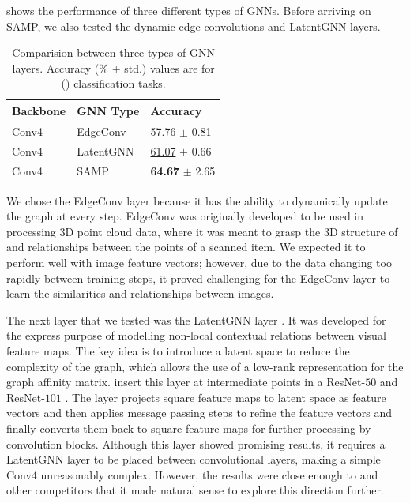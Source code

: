 shows the performance of three different types of GNNs. Before arriving on SAMP, we also tested the dynamic edge convolutions \parencite{wang2019dynamic} and LatentGNN \parencite{zhang2019latentgnn} layers.

\begin{table}[ht]
    \centering
    \begin{tabularx}{290pt}{Y Y Y}
    \toprule
        \textbf{Backbone} & \textbf{GNN Type} & \textbf{Accuracy} \\ 
        \midrule
        Conv4 & EdgeConv \citeyearpar{wang2019dynamic} & 57.76 $\pm$ 0.81 \\
        Conv4 & LatentGNN \citeyearpar{zhang2019latentgnn} & \underline{61.07} $\pm$ 0.66 \\
        Conv4 & SAMP  & \textbf{64.67} $\pm$ 2.65 \\
        \bottomrule
    \end{tabularx}
    \caption{Comparision between three types of GNN layers. Accuracy ($\%$ $\pm$ std.) values are for () \miniImagenet{} classification tasks.}
    \label{tab:gnn-types}
\end{table}

We chose the EdgeConv layer because it has the ability to dynamically update the graph at every step. EdgeConv was originally developed to be used in processing 3D point cloud data, where it was meant to grasp the 3D structure of and relationships between the points of a scanned item.
We expected it to perform well with image feature vectors; however, due to the data changing too rapidly between training steps, it proved challenging for the EdgeConv layer to learn the similarities and relationships between images.

The next layer that we tested was the LatentGNN layer \parencite{zhang2019latentgnn}. It was developed for the express purpose of modelling non-local contextual relations between visual feature maps. The key idea is to introduce a latent space to reduce the complexity of the graph, which allows the use of a low-rank representation for the graph affinity matrix. \textcite{zhang2019latentgnn} insert this layer at intermediate points in a ResNet-$50$ and ResNet-$101$ \parencite{He2015}. The layer projects square feature maps to latent space as feature vectors and then applies message passing steps to refine the feature vectors and finally converts them back to square feature maps for further processing by convolution blocks.
Although this layer showed promising results, it requires a LatentGNN layer to be placed between convolutional layers, making a simple Conv$4$ unreasonably complex. However, the results were close enough to \ccclr{} and other competitors that it made natural sense to explore this direction further.

